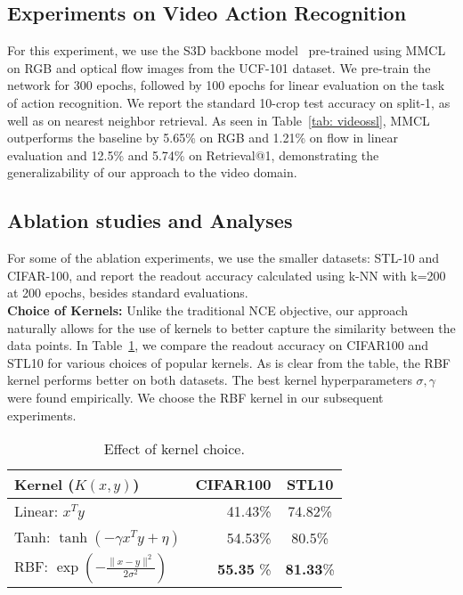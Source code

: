 \documentclass[letterpaper]{article} \usepackage{aaai22}  \usepackage{times}  \usepackage{helvet}  \usepackage{courier}  \usepackage[hyphens]{url}  \usepackage{graphicx} \urlstyle{rm} \def\UrlFont{\rm}  \usepackage{natbib}  \usepackage{caption} \DeclareCaptionStyle{ruled}{labelfont=normalfont,labelsep=colon,strut=off} \frenchspacing  \setlength{\pdfpagewidth}{8.5in}  \setlength{\pdfpageheight}{11in}
\begin{document}
\subsection{Experiments on Video Action Recognition}
For this experiment, we use the S3D backbone model~\cite{Xie2018RethinkingSF} pre-trained using MMCL on RGB and optical flow images from the UCF-101 dataset. We pre-train the network for 300 epochs, followed by 100 epochs for linear evaluation on the task of action recognition. We report the standard 10-crop test accuracy on split-1, as well as on nearest neighbor retrieval. As seen in Table~\ref{tab: videossl}, MMCL outperforms the baseline by 5.65\% on RGB and 1.21\% on flow in linear evaluation and 12.5\% and 5.74\% on Retrieval@1, demonstrating the generalizability of our approach to the video domain. 
\subsection{Ablation studies and Analyses}
For some of the ablation experiments, we use the smaller datasets: STL-10 and CIFAR-100, and report the readout accuracy calculated using k-NN with k=200 at 200 epochs, besides standard evaluations. 
\\
\noindent\textbf{Choice of Kernels:} Unlike the traditional NCE objective, our approach naturally allows for the use of kernels to better capture the similarity between the data points. In Table~\ref{tab: kernels}, we compare the readout accuracy on CIFAR100 and STL10 for various choices of popular kernels.  As is clear from the table, the RBF kernel performs better on both datasets. The best kernel hyperparameters $\sigma,\gamma$ were found empirically. We choose the RBF kernel in our subsequent experiments.

\begin{table}[]
    \centering
    \begin{tabular}{lrc}
        \toprule
        Kernel ($K(x,y)$) & CIFAR100 & STL10\\
        \midrule
        Linear: $x^Ty$ & 41.43\% & 74.82\%\\
        Tanh: $\tanh(-\gamma x^Ty+\eta)$ & 54.53\% & 80.5\% \\
        RBF: $\exp(-\frac{\|x-y\|^2}{2\sigma^2})$ & \textbf{55.35} \% & \textbf{81.33}\% \\
        \bottomrule
        \end{tabular}
   \caption{Effect of kernel choice.}
    \label{tab: kernels}
\end{table}
\end{document}
